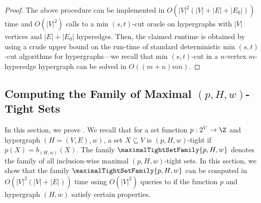 \begin{proof}
    The above procedure can be implemented in $O(|V|^2(|V| + |E| + |E_0|))$ time and $O(|V|^2)$ calls to a min $(s,t)$-cut oracle on hypergraphs with $|V|$ vertices and $|E| + |E_0|$ hyperedges. Then, the claimed runtime is obtained by using a crude upper bound on the run-time of standard deterministic min $(s,t)$-cut algorithms for hypergraphs---we recall that min $(s,t)$-cut in a $n$-vertex $m$-hyperedge hypergraph can be solved in $O((m+n)mn)$.
\end{proof}


\subsection{Computing the Family of Maximal \((p, H, w)\)-Tight Sets}\label{appendix:sec:Function-Maximization-Oracles:computing-maximal-pHw-tight-sets-family}
In this section, we prove . 
We recall that for a set function $p:2^V\rightarrow\Z$ and hypergraph $(H = (V, E), w)$, a set $X\subseteq V$ is $(p, H, w)$-tight if $p(X) = b_{(H,w)}(X)$. The family $\maximalTightSetFamily{p, H, w}$ denotes the family of all inclusion-wise maximal $(p, H, w)$-tight sets. In this section, we show that the family $\maximalTightSetFamily{p, H, w}$ can be computed in $O(|V|^2(|V| + |E|))$ time using $O(|V|^2)$ queries to  if the function $p$ and hypergraph $(H, w)$ satisfy certain properties.

